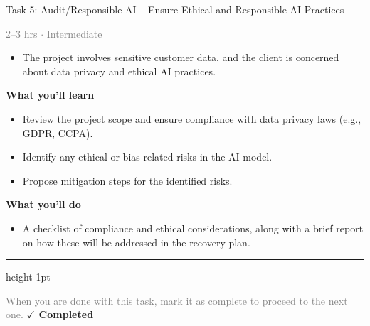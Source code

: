 \documentclass[10pt,a4paper]{article}
\begin{document}
\begin{taskbox}{Task 5: Audit/Responsible AI – Ensure Ethical and Responsible AI Practices}

    {\small \textcolor{gray}{2--3 hrs $\cdot$ Intermediate}}\\[12pt]

\begin{itemize}
    \item The project involves sensitive customer data, and the client is concerned about data privacy and ethical AI practices.

\end{itemize}
\vspace{8pt}
{\large \textbf{\textcolor{brandLight}{What you'll learn}}}\\[4pt] 
\begin{itemize}
    \item Review the project scope and ensure compliance with data privacy laws (e.g., GDPR, CCPA).
    \item Identify any ethical or bias-related risks in the AI model.
    \item Propose mitigation steps for the identified risks.

\end{itemize}
{\large \textbf{\textcolor{brandLight}{What you'll do}}}\\[4pt] 
\begin{itemize}
    \item A checklist of compliance and ethical considerations, along with a brief report on how these will be addressed in the recovery plan.\par
\end{itemize}

    \vspace{16pt}

    \textcolor{cardBorder}{\hrule height 1pt}\vspace{8pt}

    \small \textcolor{gray}{When you are done with this task, mark it as complete to proceed to the next one.} \hfill \textbf{\textcolor{brandDark}{$\checkmark$ Completed}}

\end{taskbox}
\end{document}
